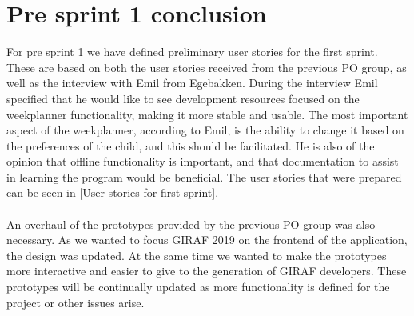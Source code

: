 \section{Pre sprint 1 conclusion}
For pre sprint 1 we have defined preliminary user stories for the first sprint.
These are based on both the user stories received from the previous PO group, as well as the interview with Emil from Egebakken.
During the interview Emil specified that he would like to see development resources focused on the weekplanner functionality, making it more stable and usable.
The most important aspect of the weekplanner, according to Emil, is the ability to change it based on the preferences of the child, and this should be facilitated.
He is also of the opinion that offline functionality is important, and that documentation to assist in learning the program would be beneficial.
The user stories that were prepared can be seen in \autoref{User-stories-for-first-sprint}.
\\\\
An overhaul of the prototypes provided by the previous PO group was also necessary.
As we wanted to focus GIRAF 2019 on the frontend of the application, the design was updated.
At the same time we wanted to make the prototypes more interactive and easier to give to the generation of GIRAF developers.
These prototypes will be continually updated as more functionality is defined for the project or other issues arise. 